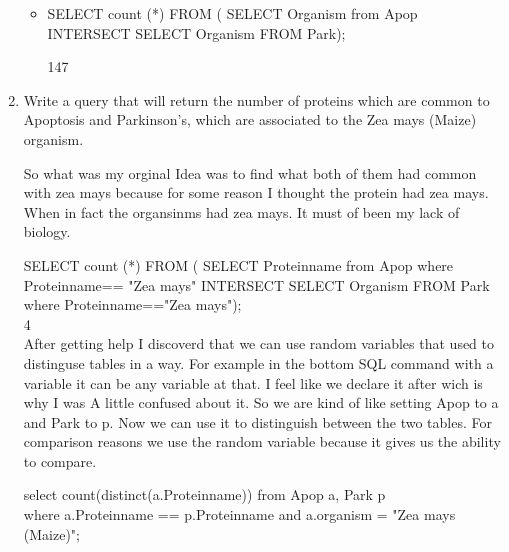 \documentclass{report}
\begin{document}
\begin{enumerate}
\begin{itemize}
\item SELECT count (*) FROM ( SELECT Organism from Apop INTERSECT SELECT Organism FROM Park);

147		
\end{itemize}
\item Write a query that will return the number of proteins which are common to Apoptosis
and Parkinson’s, which are associated to the Zea mays (Maize) organism.

So what was my orginal Idea was to find what both of them had common with zea mays because for some reason I thought the protein had zea mays. When in fact the organsinms had zea mays. It must of been my lack of biology.  



SELECT count (*) FROM ( SELECT Proteinname from Apop where Proteinname== "Zea mays"
INTERSECT SELECT Organism FROM Park where Proteinname=="Zea mays");\\
4 \\
After getting help I discoverd that we can use random variables that used to distinguse tables in a way.
For example in the bottom SQL command with a variable it can be any variable at that. I
feel like we declare it after wich is why I was A little confused about it. So we are kind of like setting Apop to a and Park to p. Now we can use it to distinguish between the two tables. For comparison reasons we use the random variable because it gives us the ability to compare. 

select count(distinct(a.Proteinname)) from Apop a, Park p \\ 
where a.Proteinname == p.Proteinname and a.organism = "Zea mays (Maize)";



\end{enumerate}
\end{document}
